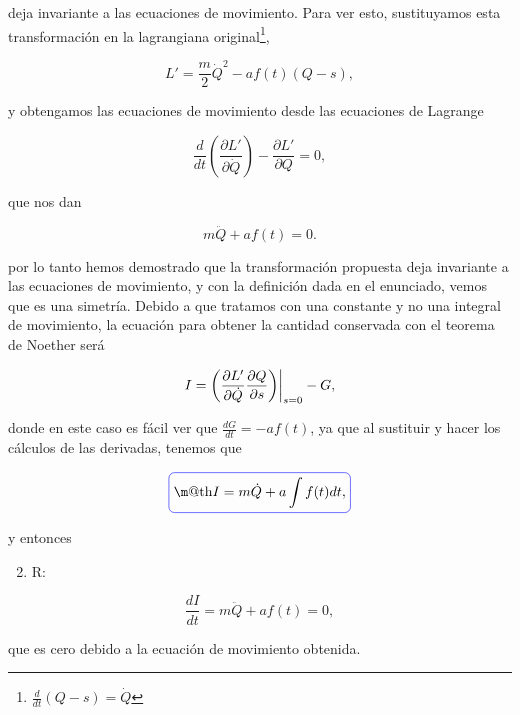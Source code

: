 \documentclass[a4paper,10pt]{article}
\makeatletter
\numberwithin{equation}{section}
\newcommand{\zerodel}{.\kern-\nulldelimiterspace}
\newcommand*{\boxcolor}{blue}
\renewcommand{\boxed}[1]{\textcolor{\boxcolor}{%
\tikz[baseline={([yshift=-1ex]current bounding box.center)}] \node [rectangle, minimum width=1ex,rounded corners,draw] {\normalcolor\m@th$\displaystyle#1$};}}
\makeatother
\begin{document}
deja invariante a las ecuaciones de movimiento. Para ver esto, sustituyamos esta 
transformación en la lagrangiana original\footnote{$\frac{d}{dt}(Q -s) = \dot{Q}$},

\begin{equation}
 L' = \frac{m}{2}\dot{Q}^2 - af(t)(Q-s),
\end{equation}

y obtengamos las ecuaciones de movimiento desde las ecuaciones de Lagrange

\begin{equation}
 \frac{d}{dt}\left(\frac{\partial L'}{\partial \dot{Q}}\right) 
 - \frac{\partial L'}{\partial Q} = 0,
\end{equation}

que nos dan

\begin{equation}
 m\ddot{Q} + af(t) = 0.
\end{equation}

por lo tanto hemos demostrado que la transformación propuesta deja invariante a las 
ecuaciones de movimiento, y con la definición dada en el enunciado, vemos que es 
una simetría. Debido a que tratamos con una constante y no una integral de movimiento, 
la ecuación para obtener la cantidad conservada con el teorema de Noether será 

\begin{equation}
 I = \left(\left\zerodel\frac{\partial L'}{\partial \dot{Q}}
 \frac{\partial Q}{\partial s}\right)\right|_{s=0} - G,
\end{equation}

donde en este caso es fácil ver que $\frac{dG}{dt} = - af(t)$, ya que al sustituir 
y hacer los cálculos de las derivadas, tenemos que 

\begin{equation}
 \boxed{I = m\dot{Q} + a\int f(t) dt,}
\end{equation}

y entonces 

\begin{enumerate}[label=\alph*)]
\setcounter{enumi}{1}
 \item R:
\end{enumerate}

\begin{equation}
 \frac{dI}{dt} = m\ddot{Q} + af(t) = 0,
\end{equation}

que es cero debido a la ecuación de movimiento obtenida.
\end{document}
